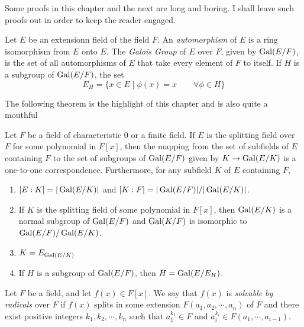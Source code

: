 Some proofs in this chapter and the next are long and boring. I shall leave such proofs out in order to keep the reader engaged.

\begin{definition}
	Let $E$ be an extensionn field of the field $F$. An \textit{automorphism} of $E$ is a ring isomorphism from $E$ onto $E$. The \textit{Galois Group} of $E$ over $F$, given by $\operatorname{Gal}(E/F)$, is the set of all automorphisms of $E$ that take every element of $F$ to itself. If $H$ is a subgroup of $\operatorname{Gal}(E/F)$, the set 
	\begin{equation*}
		E_H = \{x\in E\mid \phi(x) = x\qquad\forall\phi\in H\}
	\end{equation*}
\end{definition}

The following theorem is the highlight of this chapter and is also quite a mouthful

\begin{theorem}
	Let $F$ be a field of characteristic $0$ or a finite field. If $E$ is the splitting field over $F$ for some polynomial in $F[x]$, then the mapping from the set of subfields of $E$ containing $F$ to the set of subgroups of $\operatorname{Gal}(E/F)$ given by $K\to\operatorname{Gal}(E/K)$ is a one-to-one correspondence. Furthermore, for any subfield $K$ of $E$ containing $F$,
	\begin{enumerate}
		\item $[E:K] = |\operatorname{Gal}(E/K)|$ and $[K:F]=|\operatorname{Gal}(E/F)|/|\operatorname{Gal}(E/K)|$.
		\item If $K$ is the splitting field of some polynomial in $F[x]$, then $\operatorname{Gal}(E/K)$ is a normal subgroup of $\operatorname{Gal}(E/F)$ and $\operatorname{Gal}(K/F)$ is isomorphic to $\operatorname{Gal}(E/F)/\operatorname{Gal}(E/K)$.
		\item $K = E_{\operatorname{Gal}(E/K)}$
		\item If $H$ is a subgroup of $\operatorname{Gal}(E/F)$, then $H = \operatorname{Gal}(E/E_H)$.
	\end{enumerate}
\end{theorem}

\begin{definition}
	Let $F$ be a field, and let $f(x)\in F[x]$. We say that $f(x)$ is \textit{solvable by radicals} over $F$ if $f(x)$ splits in some extension $F(a_1,a_2,\cdots,a_n)$ of $F$ and there exist positive integers $k_1,k_2,\cdots,k_n$ such that $a_1^{k_1}\in F$ and $a_i^{k_i}\in F(a_1,\cdots,a_{i-1})$.
\end{definition}

